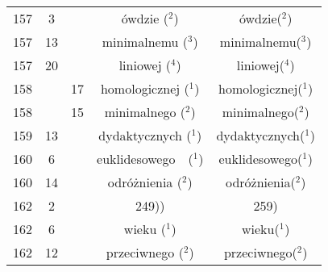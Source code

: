 \documentclass[a4paper,11pt]{article}
\numberwithin{equation}{section}
\begin{document}
\begin{center}
\begin{tabular}{|c|c|c|c|c|}
    157 & \hphantom{0}3 & & ówdzie ($^{ 2 }$) & ówdzie($^{ 2 }$) \\
    157 & 13 & & minimalnemu ($^{ 3 }$) & minimalnemu($^{ 3 }$) \\
    157 & 20 & & liniowej ($^{ 4 }$) & liniowej($^{ 4 }$) \\
    158 & & 17 & homologicznej ($^{ 1 }$) & homologicznej($^{ 1 }$) \\
    158 & & 15 & minimalnego ($^{ 2 }$) & minimalnego($^{ 2 }$) \\
    159 & 13 & & dydaktycznych ($^{ 1 }$) & dydaktycznych($^{ 1 }$) \\
    160 & \hphantom{0}6 & & euklidesowego~~($^{ 1 }$)
    & euklidesowego($^{ 1 }$) \\
    160 & 14 & & odróżnienia ($^{ 2 }$) & odróżnienia($^{ 2 }$) \\
    162 & \hphantom{0}2 & & 249)) & 259) \\
    162 & \hphantom{0}6 & & wieku ($^{ 1 }$) & wieku($^{ 1 }$) \\
    162 & 12 & & przeciwnego ($^{ 2 }$) & przeciwnego($^{ 2 }$) \\
    \hline
  \end{tabular}





  \newpage


\end{center}
\end{document}
